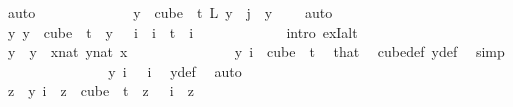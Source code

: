 \begin{isabellebody}
\ auto\isanewline
\ \ \ \ \ \ \ \ \ \ \isamarkupfalse%
\ \isamarkupfalse%
\ {\isachardoublequoteopen}{\isasymforall}y\ {\isasymin}\ cube\ {}\ t{\isachardot}{\kern0pt}\ L\ {\isacharparenleft}{\kern0pt}y\ {}{\isacharparenright}{\kern0pt}\ j\ {\isacharequal}{\kern0pt}\ y\ {}{\isachardoublequoteclose}\ \ \isamarkupfalse%
\ auto\isanewline
\ \ \ \ \ \ \ \ \ \ \isamarkupfalse%
\ \isamarkupfalse%
\ {\isachardoublequoteopen}{\isasymexists}{\isacharbang}{\kern0pt}y{\isachardot}{\kern0pt}\ y\ {\isasymin}\ cube\ {}\ t\ {\isasymand}\ y\ {}\ {\isacharequal}{\kern0pt}\ i{\isachardoublequoteclose}\ \ {\isachardoublequoteopen}i\ {\isacharless}{\kern0pt}\ t{\isachardoublequoteclose}\ \ i\ \isanewline
\ \ \ \ \ \ \ \ \ \ \isamarkupfalse%
\ {\isacharparenleft}{\kern0pt}intro\ ex{}I{\isacharunderscore}{\kern0pt}alt{\isacharparenright}{\kern0pt}\isanewline
\ \ \ \ \ \ \ \ \ \ \ \ \isamarkupfalse%
\ y\ \ {\isachardoublequoteopen}y\ {\isasymequiv}\ {\isacharparenleft}{\kern0pt}{\isasymlambda}x{\isacharcolon}{\kern0pt}{\isacharcolon}{\kern0pt}nat{\isachardot}{\kern0pt}\ {\isasymlambda}y{\isasymin}{\isacharbraceleft}{\kern0pt}{\isachardot}{\kern0pt}{\isachardot}{\kern0pt}{\isacharless}{\kern0pt}{}{\isacharcolon}{\kern0pt}{\isacharcolon}{\kern0pt}nat{\isacharbraceright}{\kern0pt}{\isachardot}{\kern0pt}\ x{\isacharparenright}{\kern0pt}{\isachardoublequoteclose}\ \isanewline
\ \ \ \ \ \ \ \ \ \ \ \ \isamarkupfalse%
\ {\isachardoublequoteopen}y\ i\ {\isasymin}\ {\isacharparenleft}{\kern0pt}cube\ {}\ t{\isacharparenright}{\kern0pt}{\isachardoublequoteclose}\ \isamarkupfalse%
\ that\ \isamarkupfalse%
\ cube{\isacharunderscore}{\kern0pt}def\ y{\isacharunderscore}{\kern0pt}def\ \isamarkupfalse%
\ simp\isanewline
\ \ \ \ \ \ \ \ \ \ \ \ \isamarkupfalse%
\ \isamarkupfalse%
\ {\isachardoublequoteopen}y\ i\ {}\ {\isacharequal}{\kern0pt}\ i{\isachardoublequoteclose}\ \isamarkupfalse%
\ y{\isacharunderscore}{\kern0pt}def\ \isamarkupfalse%
\ auto\isanewline
\ \ \ \ \ \ \ \ \ \ \ \ \isamarkupfalse%
\ \isamarkupfalse%
\ {\isachardoublequoteopen}z\ {\isacharequal}{\kern0pt}\ y\ i{\isachardoublequoteclose}\ \ {\isachardoublequoteopen}z\ {\isasymin}\ cube\ {}\ t{\isachardoublequoteclose}\ \ {\isachardoublequoteopen}z\ {}\ {\isacharequal}{\kern0pt}\ i{\isachardoublequoteclose}\ \ z\isanewline

\end{isabellebody}
